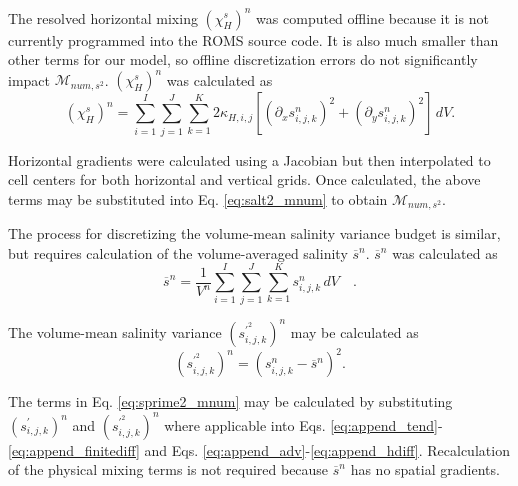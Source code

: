 The resolved horizontal mixing $(\chi_H^s)^n$ was computed offline because it is not currently programmed into the ROMS source code. It is also much smaller than other terms for our model, so offline discretization errors do not significantly impact $\mathcal{M}_{num, s^2}$.  $(\chi_H^s)^n$ was calculated as
\begin{equation} \label{eq:append_hmix}
        (\chi_H^s)^n = \sum_{i=1}^{I}\sum_{j=1}^{J}\sum_{k=1}^{K} 2\kappa_{H,i,j} \left[ \left(\partial_x s_{i,j,k}^n \right)^2+\left(\partial_y s_{i,j,k}^n \right)^2 \right]  \, dV.
\end{equation}

Horizontal gradients were calculated using a Jacobian but then interpolated to cell centers for both horizontal and vertical grids. Once calculated, the above terms may be substituted into Eq. \ref{eq:salt2_mnum} to obtain $\mathcal{M}_{num, s^2}$.

The process for discretizing the volume-mean salinity variance budget is similar, but requires calculation of the volume-averaged salinity $\overline{s}^n$. $\overline{s}^n$ was calculated as
\begin{equation}
        \overline{s}^n = \frac{1}{V^n} \sum_{i=1}^{I}\sum_{j=1}^{J}\sum_{k=1}^{K} s_{i,j,k}^n \, dV \quad .
\end{equation}

The volume-mean salinity variance $(s_{i,j,k}^{{\prime^2}})^n$ may be calculated as
\begin{equation}
        \left(s_{i,j,k}^{{\prime^2}} \right)^n = \left(s_{i,j,k}^n-\overline{s}^n \right)^2.
\end{equation}

The terms in Eq. \ref{eq:sprime2_mnum} may be calculated by substituting $(s_{i,j,k}^{\prime})^n$ and $(s_{i,j,k}^{\prime^2})^n$ where applicable into Eqs. \ref{eq:append_tend}-\ref{eq:append_finitediff} and Eqs. \ref{eq:append_adv}-\ref{eq:append_hdiff}. Recalculation of the physical mixing terms is not required because $\overline{s}^n$ has no spatial gradients.

% 
% 

